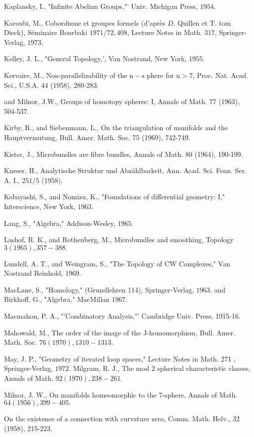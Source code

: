 \documentclass[10pt]{article}
\begin{document}
Kaplansky, I., "Infinite Abelian Groups,"' Univ. Michigan Press, $1954 .$

Karoubi, M., Cobordisme et groupes formels (d'après $D$. Quillen et T. tom Dieck), Séminaire Bourbaki $1971 / 72,408$, Lecture Notes in Math. 317, Springer-Verlag, $1973 .$

Kelley, J. L., "General Topology,', Van Nostrand, New York, $1955 .$

Kervaire, M., Non-parallelizability of the $\mathrm{n}-\mathrm{s}$ phere for $\mathrm{n}>7$, Proc. Nat. Acad. Sci., U.S.A. 44 (1958), 280-283.

and Milnor, J.W., Groups of homotopy spheres: I, Annals of Math. 77 (1963), 504-537.

Kirby, R., and Siebenmann, L., On the triangulation of manifolds and the Hauptvermutung, Bull. Amer. Math. Soc. 75 (1969), 742-749.

Kister, J., Microbundles are fibre bundles, Annals of Math. 80 (1964), 190-199.

Kneser, H., Analytische Struktur und Abzählbarkeit, Ann. Acad. Sci. Fenn. Ser. A. I., $251 / 5$ (1958).

Kobayashi, S., and Nomizu, K., "Foundations of differential geometry: I," Interscience, New York, $1963 .$

Lang, S., "Algebra," Addison-Wesley, $1965 .$

Lashof, R. K., and Rothenberg, M., Microbundles and smoothing, Topology $3(1965), 357-388 .$

Lundell, A. T., and Weingram, S., "The Topology of CW Complexes," Van Nostrand Reinhold, $1969 .$

MacLane, S., "Homology," (Grundlehren 114), Springer-Verlag, $1963 .$ and Birkhoff, G., "Algebra," MacMillan $1967 .$

Macmahon, P. A., "'Combinatory Analysis,"' Cambridge Univ. Press, 1915-16.

Mahowald, M., The order of the image of the J-homomorphism, Bull. Amer. Math. Soc. $76(1970), 1310-1313 .$

May, J. P., "Geometry of iterated loop spaces," Lecture Notes in Math. 271 , Springer-Verlag, $1972 .$ Milgram, R. J., The mod 2 spherical characteristic classes, Annals of Math. $92(1970), 238-261 .$

Milnor, J. W., On manifolds homeomorphic to the 7-sphere, Annals of Math. $64(1956), 399-405 .$

On the existence of a connection with curvature zero, Comm. Math. Helv., 32 (1958), 215-223.
\end{document}
